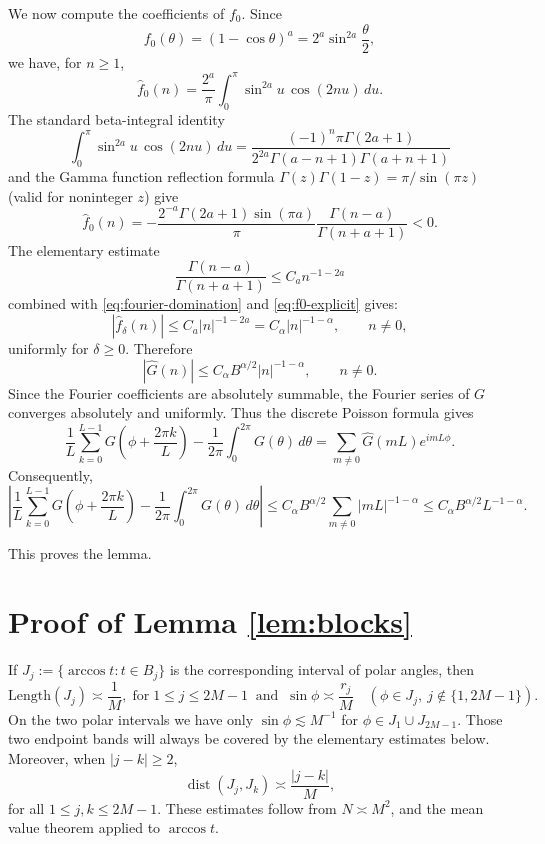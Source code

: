\documentclass[11pt]{amsart}
\begin{document}
We now compute the coefficients of $f_0$. Since
\[
    f_0(\theta)
    =(1-\cos\theta)^a
    =2^a\sin^{2a}\frac{\theta}{2},
\]
we have, for $n\geq1$,
\[
    \widehat f_0(n)
    =
    \frac{2^a}{\pi}
    \int_0^\pi
    \sin^{2a}u\,\cos(2nu)\,du.
\]
The standard beta-integral identity \cite[3.631 (8)]{GR07}
\[
    \int_0^\pi
    \sin^{2a}u\,\cos(2nu)\,du
    =
    \frac{(-1)^n\pi\Gamma(2a+1)}
    {2^{2a}\Gamma(a-n+1)\Gamma(a+n+1)}
\]
and the Gamma function reflection formula $\Gamma(z)\Gamma(1-z)=\pi/\sin(\pi z)$ (valid for noninteger $z$) give
\begin{equation}\label{eq:f0-explicit}
    \widehat f_0(n)
    =
    -\frac{2^{-a}\Gamma(2a+1)\sin(\pi a)}{\pi}
    \frac{\Gamma(n-a)}{\Gamma(n+a+1)}<0.
\end{equation}
The elementary estimate \[
    \frac{\Gamma(n-a)}{\Gamma(n+a+1)}
    \leq C_a n^{-1-2a}
\]
combined with \eqref{eq:fourier-domination} and
\eqref{eq:f0-explicit} gives:
\[
    |\widehat f_\delta(n)|
    \leq C_a |n|^{-1-2a}
    =
    C_\alpha |n|^{-1-\alpha},
    \qquad n\neq0,
\]
uniformly for $\delta\geq0$. Therefore
\[
    |\widehat G(n)|
    \leq
    C_\alpha B^{\alpha/2}|n|^{-1-\alpha},
    \qquad n\neq0.
\]
Since the Fourier coefficients are absolutely summable, the Fourier
series of $G$ converges absolutely and uniformly. Thus the discrete Poisson formula
gives
\[
    \frac1L\sum_{k=0}^{L-1}
    G\left(\phi+\frac{2\pi k}{L}\right)
    -
    \frac1{2\pi}\int_0^{2\pi}G(\theta)\,d\theta
    =
    \sum_{m\neq0}
    \widehat G(mL)e^{imL\phi}.
\]
Consequently,
\begin{equation*}
    \left|
    \frac1L\sum_{k=0}^{L-1}
    G\left(\phi+\frac{2\pi k}{L}\right)
    -
    \frac1{2\pi}\int_0^{2\pi}G(\theta)\,d\theta
    \right|
    \leq
    C_\alpha B^{\alpha/2}
    \sum_{m\neq0}|mL|^{-1-\alpha}\leq
    C_\alpha B^{\alpha/2}L^{-1-\alpha}.
\end{equation*}

This proves the lemma.
\section{Proof of Lemma \ref{lem:blocks}}\label{appendix2}

If $J_j:=\{\arccos t:t\in B_j\}$ is the corresponding interval of polar
angles, then
\begin{equation}\label{eq:angular-band-scales}
 \mathrm{Length}(J_j)\asymp \frac1M,\;\mbox{for}\;1\le j\le 2M-1
 \;\;\mbox{and}\;\;
 \sin\phi\asymp\frac{r_j}{M}
 \quad(\phi\in J_j,\ j\notin\{1,2M-1\}).    %
\end{equation}
On the two polar intervals we have only
$\sin \phi\lesssim M^{-1}$
for $\phi\in J_1\cup J_{2M-1}.$
Those two endpoint
bands will always be covered by the elementary estimates below. Moreover,
when $|j-k|\ge2$,
\begin{equation}\label{eq:angular-separation-bands}
 \operatorname{dist}(J_j,J_k)\asymp\frac{|j-k|}{M},
\end{equation}
for all $1\le j,k\le 2M-1.$
These estimates follow from $N\asymp M^2$,
and the mean value theorem applied to $\arccos t$.
\end{document}
